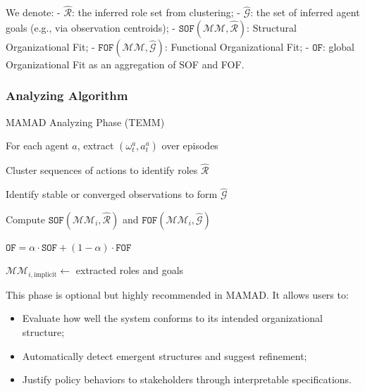 \documentclass[pdflatex,sn-mathphys-num]{sn-jnl}%
\theoremstyle{thmstyleone}%
\theoremstyle{thmstyletwo}%
\theoremstyle{thmstylethree}%
\begin{document}
We denote:
- $\hat{\mathcal{R}}$: the inferred role set from clustering;
- $\hat{\mathcal{G}}$: the set of inferred agent goals (e.g., via observation centroids);
- $\texttt{SOF}(\mathcal{MM}, \hat{\mathcal{R}})$: Structural Organizational Fit;
- $\texttt{FOF}(\mathcal{MM}, \hat{\mathcal{G}})$: Functional Organizational Fit;
- $\texttt{OF}$: global Organizational Fit as an aggregation of SOF and FOF.

\subsubsection*{Analyzing Algorithm}

\begin{algorithm}[H]
    \caption{MAMAD Analyzing Phase (TEMM)}
    \label{alg:analyzing}
    \DontPrintSemicolon

    For each agent $a$, extract $(\omega_t^a, a_t^a)$ over episodes

    Cluster sequences of actions to identify roles $\hat{\mathcal{R}}$

    Identify stable or converged observations to form $\hat{\mathcal{G}}$

    Compute $\texttt{SOF}(\mathcal{MM}_i, \hat{\mathcal{R}})$ and $\texttt{FOF}(\mathcal{MM}_i, \hat{\mathcal{G}})$

    $\texttt{OF} = \alpha \cdot \texttt{SOF} + (1 - \alpha) \cdot \texttt{FOF}$

    $\mathcal{MM}_{i,\text{implicit}} \gets$ extracted roles and goals

\end{algorithm}

This phase is optional but highly recommended in MAMAD. It allows users to:

\begin{itemize}
    \item Evaluate how well the system conforms to its intended organizational structure;
    \item Automatically detect emergent structures and suggest refinement;
    \item Justify policy behaviors to stakeholders through interpretable specifications.
\end{itemize}
\end{document}
